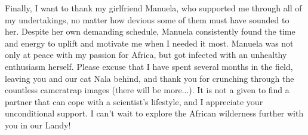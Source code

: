 \documentclass[../FinalThesis.tex]{subfiles}
\begin{document}
Finally, I want to thank my girlfriend Manuela, who supported me through all of
my undertakings, no matter how devious some of them must have sounded to her.
Despite her own demanding schedule, Manuela consistently found the time and
energy to uplift and motivate me when I needed it most. Manuela was not only at
peace with my passion for Africa, but got infected with an unhealthy enthusiasm
herself. Please excuse that I have spent several months in the field, leaving
you and our cat Nala behind, and thank you for crunching through the countless
cameratrap images (there will be more...). It is not a given to find a partner
that can cope with a scientist's lifestyle, and I appreciate your unconditional
support. I can't wait to explore the African wilderness further with you in our
Landy!
\end{document}
